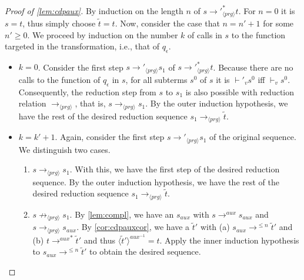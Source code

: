 \begin{proof}[Proof of \autoref{lem:cdpaux}]

By induction on the length $n$ of $s {\longrightarrow'}_{\langle prg \rangle}^* t$. For $n = 0$ it is $s = t$, thus simply choose $\widetilde{t} = t$. Now, consider the case that $n = n'+1$ for some $n' \geq 0$. We proceed by induction on the number $k$ of calls in $s$ to the function targeted in the transformation, i.e., that of $q_\epsilon$.

\begin{itemize}
\item $k = 0$. Consider the first step $s {\longrightarrow'}_{\langle prg \rangle} s_1$ of $s {\longrightarrow'}_{\langle prg \rangle}^* t$. Because there are no calls to the function of $q_\epsilon$ in $s$, for all subterms $s^0$ of $s$ it is $\vdash'_v s^0$ iff $\vdash_v s^0$. Consequently, the reduction step from $s$ to $s_1$ is also possible with reduction relation $\longrightarrow_{\langle prg \rangle}$, that is, $s \longrightarrow_{\langle prg \rangle} s_1$. By the outer induction hypothesis, we have the rest of the desired reduction sequence $s_1 \longrightarrow_{\langle prg \rangle} \widetilde{t}$.

\item $k = k' + 1$. Again, consider the first step $s {\longrightarrow'}_{\langle prg \rangle} s_1$ of the original sequence. We distinguish two cases.
\begin{enumerate}
\item $s \longrightarrow_{\langle prg \rangle} s_1$. With this, we have the first step of the desired reduction sequence. By the outer induction hypothesis, we have the rest of the desired reduction sequence $s_1 \longrightarrow_{\langle prg \rangle} \widetilde{t}$.

\item $s \not\longrightarrow_{\langle prg \rangle} s_1$. By \autoref{lem:compl}, we have an $s_{aux}$ with $s \longrightarrow^{aux} s_{aux}$ and $s \longrightarrow_{\langle prg \rangle} s_{aux}$. By \autoref{cor:cdpauxcor}, we have a $\widetilde{t}'$ with (a) $s_{aux} \longrightarrow^{\leq n} \widetilde{t}'$ and (b) $t {\longrightarrow^{aux}}^* \widetilde{t}'$ and thus $\langle \widetilde{t}' \rangle^{aux^{-1}} = t$. Apply the inner induction hypothesis to $s_{aux} \longrightarrow^{\leq n} \widetilde{t}'$ to obtain the desired sequence.
\end{enumerate}
\end{itemize}

\end{proof}

